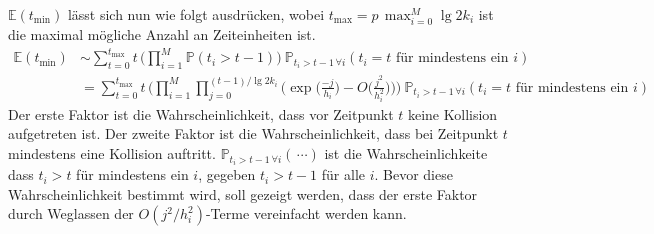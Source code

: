 \documentclass[a4paper, 10pt, ngerman]{article}
\newcommand{\E}{\mathbb{E}}
\renewcommand{\P}{\mathbb{P}}
\begin{document}
$\E(t_{\min})$ lässt sich nun wie folgt ausdrücken, wobei $t_{\max} = p \, \max_{i = 0}^M \lg 2k_i$ ist die maximal mögliche Anzahl an Zeiteinheiten ist.
\begin{align*}
    \E(t_{\min})
     & \sim \sum_{t = 0}^{t_{\max}} t \,
    \Bigg ( \prod_{i = 1}^M \P(t_i > t - 1) \Bigg ) \
    \P_{t_i > t - 1 \, \forall i}(t_i = t \text{ für mindestens ein } i) \\
     & = \sum_{t = 0}^{t_{\max}} t \,
    \Bigg ( \prod_{i = 1}^M \prod_{j = 0}^{(t-1) / \lg 2k_i}
    \Bigg ( \exp \bigg ( \frac {-j}{h_i} \bigg )
        - O \bigg ( \frac {j^2} {h_i^2} \bigg ) \Bigg )\Bigg ) \
    \P_{t_i > t - 1 \, \forall i}(t_i = t \text{ für mindestens ein } i)
\end{align*}
Der erste Faktor ist die Wahrscheinlichkeit, dass vor Zeitpunkt $t$ keine Kollision aufgetreten ist. Der zweite Faktor ist die Wahrscheinlichkeit, dass bei Zeitpunkt $t$ mindestens eine Kollision auftritt. $\P_{t_i > t - 1 \, \forall i} (\,\cdots)$ ist die Wahrscheinlichkeite dass $t_i > t$ für mindestens ein $i$, gegeben $t_i > t - 1$ für alle $i$. Bevor diese Wahrscheinlichkeit bestimmt wird, soll gezeigt werden, dass der erste Faktor durch Weglassen der $O(j^2/h_i^2)$-Terme vereinfacht werden kann.
\end{document}
